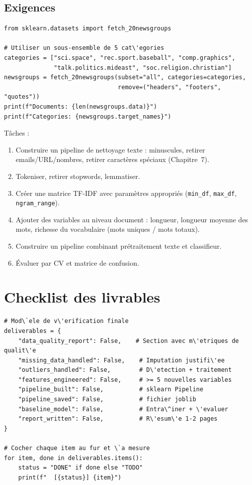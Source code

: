 \subsection{Exigences}

\begin{verbatim}
from sklearn.datasets import fetch_20newsgroups

# Utiliser un sous-ensemble de 5 cat\'egories
categories = ["sci.space", "rec.sport.baseball", "comp.graphics",
              "talk.politics.mideast", "soc.religion.christian"]
newsgroups = fetch_20newsgroups(subset="all", categories=categories,
                                remove=("headers", "footers", "quotes"))
print(f"Documents: {len(newsgroups.data)}")
print(f"Categories: {newsgroups.target_names}")
\end{verbatim}

T\^aches :
\begin{enumerate}
  \item Construire un pipeline de nettoyage texte : minuscules, retirer emails/URL/nombres, retirer caract\`eres sp\'eciaux (Chapitre~7).
  \item Tokeniser, retirer stopwords, lemmatiser.
  \item Cr\'eer une matrice TF-IDF avec param\`etres appropri\'es (\texttt{min\_df}, \texttt{max\_df}, \texttt{ngram\_range}).
  \item Ajouter des variables au niveau document : longueur, longueur moyenne des mots, richesse du vocabulaire (mots uniques / mots totaux).
  \item Construire un pipeline combinant pr\'etraitement texte et classifieur.
  \item \'Evaluer par CV et matrice de confusion.
\end{enumerate}

\section{Checklist des livrables}

\begin{verbatim}
# Mod\`ele de v\'erification finale
deliverables = {
    "data_quality_report": False,    # Section avec m\'etriques de qualit\'e
    "missing_data_handled": False,    # Imputation justifi\'ee
    "outliers_handled": False,        # D\'etection + traitement
    "features_engineered": False,     # >= 5 nouvelles variables
    "pipeline_built": False,          # sklearn Pipeline
    "pipeline_saved": False,          # fichier joblib
    "baseline_model": False,          # Entra\^iner + \'evaluer
    "report_written": False,          # R\'esum\'e 1-2 pages
}

# Cocher chaque item au fur et \`a mesure
for item, done in deliverables.items():
    status = "DONE" if done else "TODO"
    print(f"  [{status}] {item}")
\end{verbatim}


